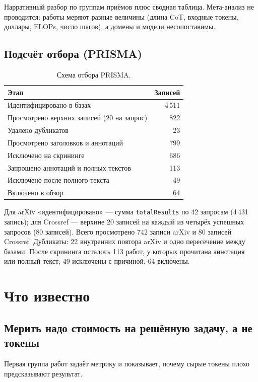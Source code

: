 \documentclass[11pt,a4paper]{article}
\newcommand{\code}[1]{\texttt{#1}}
\begin{document}
Нарративный разбор по группам приёмов плюс сводная таблица. Мета-анализ не
проводится: работы меряют разные величины (длина CoT, входные токены,
доллары, FLOPs, число шагов), а домены и модели несопоставимы.

\subsection{Подсчёт отбора (PRISMA)}

\begin{table}[h]
\centering
\begin{tabular}{lr}
\toprule
Этап & Записей \\
\midrule
Идентифицировано в базах & 4\,511 \\
Просмотрено верхних записей (20 на запрос) & 822 \\
Удалено дубликатов & 23 \\
Просмотрено заголовков и аннотаций & 799 \\
Исключено на скрининге & 686 \\
Запрошено аннотаций и полных текстов & 113 \\
Исключено после полного текста & 49 \\
Включено в обзор & 64 \\
\bottomrule
\end{tabular}
\caption{Схема отбора PRISMA.}
\end{table}

Для arXiv «идентифицировано» — сумма \code{totalResults} по 42 запросам
(4\,431 запись); для Crossref — верхние 20 записей на каждый из четырёх
успешных запросов (80 записей). Всего просмотрено 742 записи arXiv и 80
записей Crossref. Дубликаты: 22 внутренних повтора arXiv и одно пересечение
между базами. После скрининга осталось 113 работ, у которых прочитана
аннотация или полный текст; 49 исключены с причиной, 64 включены.

\section{Что известно}

\subsection{Мерить надо стоимость на решённую задачу, а не токены}

Первая группа работ задаёт метрику и показывает, почему сырые токены плохо
предсказывают результат.
\end{document}
